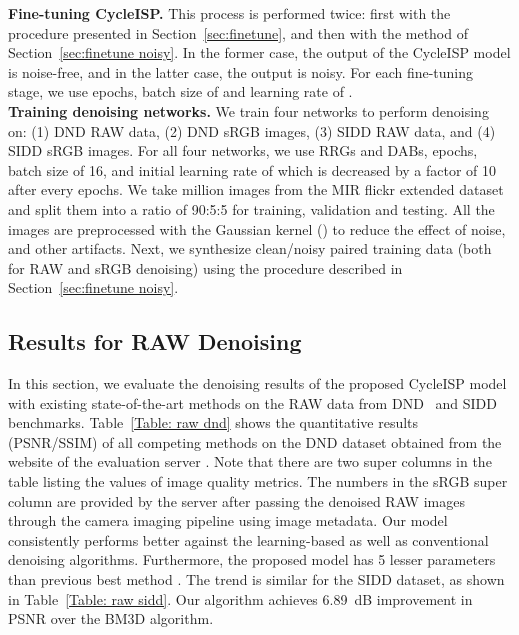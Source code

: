 \documentclass[10pt,twocolumn,letterpaper]{article}
\begin{document}
\vspace{0.4em}
\noindent \textbf{Fine-tuning CycleISP.} This process is performed twice: first with the procedure presented in Section~\ref{sec:finetune}, and then with the method of Section~\ref{sec:finetune noisy}. 
In the former case, the output of the CycleISP model is noise-free, and in the latter case, the output is noisy. 
For each fine-tuning stage, we use  epochs, batch size of  and learning rate of .  
\vspace{0.4em}\\
\noindent \textbf{Training denoising networks.} We train four networks to perform denoising on: (1) DND RAW data, (2) DND sRGB images, (3) SIDD RAW data, and (4) SIDD sRGB images. 
For all four networks, we use  RRGs and  DABs,  epochs, batch size of 16, and initial learning rate of  which is decreased by a factor of 10 after every  epochs.  
We take  million images from the MIR flickr extended dataset \cite{flickr} and split them into a ratio of 90:5:5 for training, validation and testing. 
All the images are preprocessed with the Gaussian kernel () to reduce the effect of noise, and other artifacts. 
Next, we synthesize clean/noisy paired training data (both for RAW and sRGB denoising) using the procedure described in Section~\ref{sec:finetune noisy}.

\subsection{Results for RAW Denoising}
In this section, we evaluate the denoising results of the proposed CycleISP model with existing state-of-the-art methods on the RAW data from DND~\cite{dnd} and SIDD~\cite{sidd} benchmarks. 
Table~\ref{Table: raw dnd} shows the quantitative results (PSNR/SSIM) of all competing methods on the DND dataset
obtained from the website of the evaluation server \cite{dndwebsite}. 
Note that  there are two super columns in the table listing the values of image quality metrics. 
The numbers in the sRGB super column are provided by the server after passing the denoised RAW images through the camera imaging pipeline \cite{karaimer2016software} using image metadata. 
Our model consistently performs  
better against the learning-based as well as conventional denoising algorithms.
Furthermore, the proposed model has 5 lesser parameters than previous best method \cite{Brooks2019}.
The trend is similar for the SIDD dataset, as shown in Table~\ref{Table: raw sidd}. Our algorithm achieves 6.89~dB improvement in PSNR over the BM3D algorithm\cite{BM3D}.   
\end{document}
